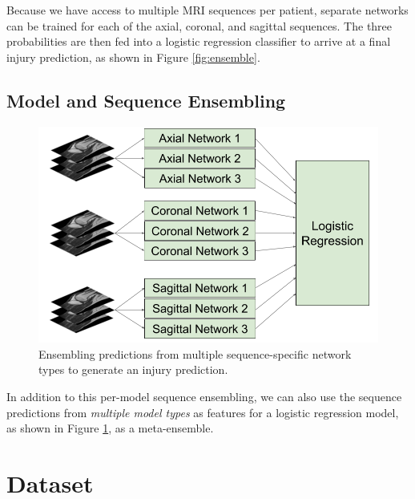 \documentclass[10pt,twocolumn,letterpaper]{article}
\begin{document}
Because we have access to multiple MRI sequences per patient, separate networks can be trained for each of the axial, coronal, and sagittal sequences. The three probabilities are then fed into a logistic regression classifier to arrive at a final injury prediction, as shown in Figure \ref{fig:ensemble}.

\subsection{Model and Sequence Ensembling}
\begin{figure}
\begin{center}
\includegraphics[width=0.8\linewidth]{../images/diagram/ensemble-of-ensembles.png}
\end{center}
   \caption{Ensembling predictions from multiple sequence-specific network types to generate an injury prediction.}
\label{fig:ensemble-of-ensembles}
\end{figure}

In addition to this per-model sequence ensembling, we can also use the sequence predictions from \textit{multiple model types} as features for a logistic regression model, as shown in Figure \ref{fig:ensemble-of-ensembles}, as a meta-ensemble.

\section{Dataset} %
\end{document}
